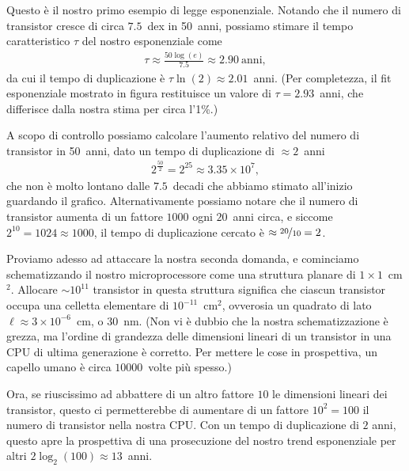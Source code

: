 \begin{solution}

\begin{center}
    
\end{center}

Questo è il nostro primo esempio di legge esponenziale. Notando che il numero
di transistor cresce di circa $7.5$~dex in 50~anni, possiamo stimare il tempo
caratteristico $\tau$ del nostro esponenziale come
\begin{align*}
  \tau \approx \frac{50 \log(e)}{7.5} \approx 2.90~\text{anni},
\end{align*}
da cui il tempo di duplicazione è $\tau \ln(2) \approx 2.01$~anni. (Per completezza,
il fit esponenziale mostrato in figura restituisce un valore di $\tau = 2.93$~anni,
che differisce dalla nostra stima per circa l'1\%.)

A scopo di controllo possiamo calcolare l'aumento relativo del numero di
transistor in 50~anni, dato un tempo di duplicazione di $\approx 2$~anni
\begin{align*}
  2^{\frac{50}{2}} = 2^{25} \approx 3.35 \times 10^7,
\end{align*}
che non è molto lontano dalle $7.5$~decadi che abbiamo stimato all'inizio
guardando il grafico. Alternativamente possiamo notare che il numero di
transistor aumenta di un fattore $1000$ ogni $20$~anni circa, e siccome
$2^{10} = 1024 \approx 1000$, il tempo di duplicazione cercato è
$\approx \nicefrac{20}{10} = 2$.

Proviamo adesso ad attaccare la nostra seconda domanda, e cominciamo schematizzando
il nostro microprocessore come una struttura planare di $1 \times 1$~cm$^2$.
Allocare $\sim 10^{11}$ transistor in questa struttura significa che
ciascun transistor occupa una celletta elementare di $10^{-11}$~cm$^2$, ovverosia
un quadrato di lato $\ell \approx 3 \times 10^{-6}$~cm, o $30$~nm. (Non vi è
dubbio che la nostra schematizzazione è grezza, ma l'ordine di grandezza delle
dimensioni lineari di un transistor in una CPU di ultima generazione è corretto.
Per mettere le cose in prospettiva, un capello umano è circa $10000$~volte
più spesso.)

Ora, se riuscissimo ad abbattere di un altro fattore $10$ le dimensioni lineari
dei transistor, questo ci permetterebbe di aumentare di un fattore $10^2 = 100$
il numero di transistor nella nostra CPU. Con un tempo di duplicazione di $2$
anni, questo apre la prospettiva di una prosecuzione del nostro trend esponenziale
per altri $2 \log_2(100) \approx 13$~anni.


\end{solution}

